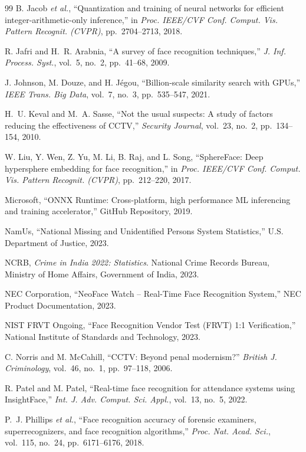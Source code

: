 \documentclass[12pt, a4paper]{article}
\begin{document}
\begin{thebibliography}{99}
B. Jacob \textit{et al.}, ``Quantization and training of neural networks for efficient integer-arithmetic-only inference,'' in \textit{Proc. IEEE/CVF Conf. Comput. Vis. Pattern Recognit. (CVPR)}, pp.~2704--2713, 2018.

R. Jafri and H.~R. Arabnia, ``A survey of face recognition techniques,'' \textit{J. Inf. Process. Syst.}, vol.~5, no.~2, pp.~41--68, 2009.

J. Johnson, M. Douze, and H. J\'{e}gou, ``Billion-scale similarity search with GPUs,'' \textit{IEEE Trans. Big Data}, vol.~7, no.~3, pp.~535--547, 2021.

H.~U. Keval and M.~A. Sasse, ``Not the usual suspects: A study of factors reducing the effectiveness of CCTV,'' \textit{Security Journal}, vol.~23, no.~2, pp.~134--154, 2010.

W. Liu, Y. Wen, Z. Yu, M. Li, B. Raj, and L. Song, ``SphereFace: Deep hypersphere embedding for face recognition,'' in \textit{Proc. IEEE/CVF Conf. Comput. Vis. Pattern Recognit. (CVPR)}, pp.~212--220, 2017.

Microsoft, ``ONNX Runtime: Cross-platform, high performance ML inferencing and training accelerator,'' GitHub Repository, 2019.

NamUs, ``National Missing and Unidentified Persons System Statistics,'' U.S. Department of Justice, 2023.

NCRB, \textit{Crime in India 2022: Statistics}. National Crime Records Bureau, Ministry of Home Affairs, Government of India, 2023.

NEC Corporation, ``NeoFace Watch -- Real-Time Face Recognition System,'' NEC Product Documentation, 2023.

NIST FRVT Ongoing, ``Face Recognition Vendor Test (FRVT) 1:1 Verification,'' National Institute of Standards and Technology, 2023.

C. Norris and M. McCahill, ``CCTV: Beyond penal modernism?'' \textit{British J. Criminology}, vol.~46, no.~1, pp.~97--118, 2006.

R. Patel and M. Patel, ``Real-time face recognition for attendance systems using InsightFace,'' \textit{Int. J. Adv. Comput. Sci. Appl.}, vol.~13, no.~5, 2022.

P.~J. Phillips \textit{et al.}, ``Face recognition accuracy of forensic examiners, superrecognizers, and face recognition algorithms,'' \textit{Proc. Nat. Acad. Sci.}, vol.~115, no.~24, pp.~6171--6176, 2018.


\end{thebibliography}
\end{document}
